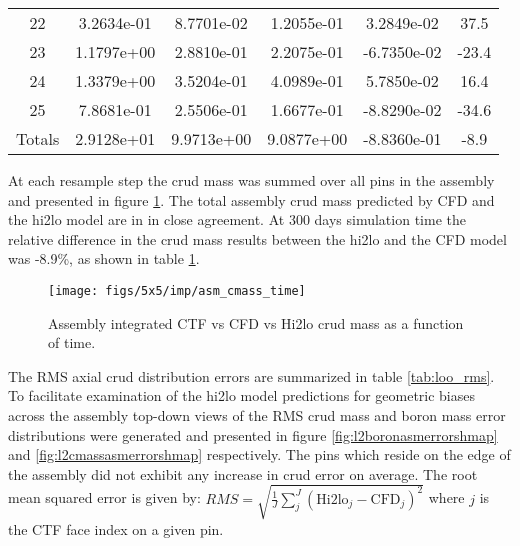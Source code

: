 \begin{table}[h]
\begin{center}
\begin{tabular}[h]{|c|c|c|c|c|c|}
22	 &3.2634e-01 & 8.7701e-02 & 1.2055e-01 & 3.2849e-02 & 37.5\\
23	 &1.1797e+00 & 2.8810e-01 & 2.2075e-01 & -6.7350e-02  & -23.4\\
24	 &1.3379e+00 & 3.5204e-01 & 4.0989e-01 & 5.7850e-02 & 16.4\\
25	 &7.8681e-01 & 2.5506e-01 & 1.6677e-01 & -8.8290e-02  & -34.6\\
\hline \hline
Totals	 & 2.9128e+01 & 9.9713e+00 & 9.0877e+00 & -8.8360e-01  & -8.9\\
\hline
\end{tabular}
\label{tab:loo_crud_cmass}
\end{center}
\end{table}


At each resample step the crud mass was summed over all pins in the assembly and presented in figure \ref{fig:asmcmasstime}.  The total assembly crud mass predicted by CFD and the hi2lo model are in in close agreement.  At 300 days simulation time the relative difference in the crud mass results between the hi2lo and the CFD model was -8.9\%, as shown in table \ref{tab:loo_crud_cmass}.

\begin{figure}[]
    \centering
    \texttt{[image: figs/5x5/imp/asm\_cmass\_time]}
    \caption{Assembly integrated CTF vs CFD vs Hi2lo crud mass as a function of time.}
    \label{fig:asmcmasstime}
\end{figure}

The RMS axial crud distribution errors are summarized in table \ref{tab:loo_rms}.  To facilitate examination of the hi2lo model predictions for geometric biases across the assembly top-down views of the RMS crud mass and boron mass error distributions were generated and presented in figure \ref{fig:l2boronasmerrorshmap} and \ref{fig:l2cmassasmerrorshmap} respectively.  The pins which reside on the edge of the assembly did not exhibit any increase in crud error on average.  The root mean squared error is given by: $RMS = \sqrt{\frac{1}{J}\sum^J_j(\mathrm{Hi2lo}_j - \mathrm{CFD}_j)^2}$ where $j$ is the CTF face index on a given pin.


